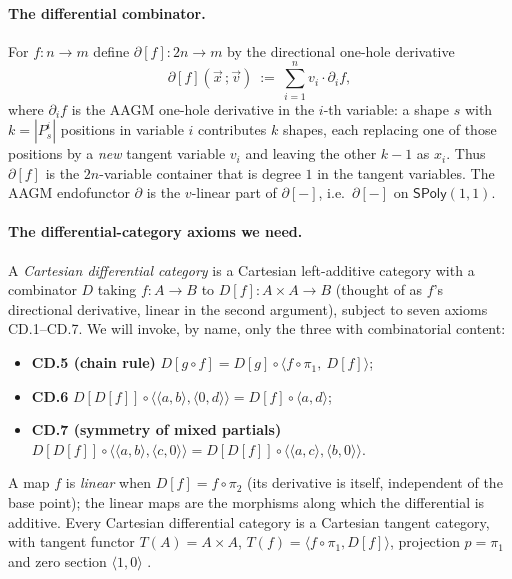 \documentclass[11pt]{article}
\theoremstyle{definition}
\newcommand{\SPoly}{\mathsf{SPoly}}
\begin{document}
\paragraph{The differential combinator.}
For $f\colon n\to m$ define $\partial[f]\colon 2n\to m$ by the directional one-hole derivative
\[
  \partial[f](\vec x\,;\vec v)\ :=\ \sum_{i=1}^{n} v_i\cdot\partial_i f,
\]
where $\partial_i f$ is the AAGM one-hole derivative in the $i$-th variable: a shape $s$ with
$k=|P^i_s|$ positions in variable $i$ contributes $k$ shapes, each replacing one of those positions
by a \emph{new} tangent variable $v_i$ and leaving the other $k-1$ as $x_i$. Thus $\partial[f]$ is
the $2n$-variable container that is degree $1$ in the tangent variables. The AAGM endofunctor
$\partial$ is the $v$-linear part of $\partial[-]$, i.e.\ $\partial[-]$ on $\SPoly(1,1)$.

\paragraph{The differential-category axioms we need.}
A \emph{Cartesian differential category} \cite{BCS2009} is a Cartesian left-additive category with a
combinator $D$ taking $f\colon A\to B$ to $D[f]\colon A\times A\to B$ (thought of as $f$'s directional
derivative, linear in the second argument), subject to seven axioms CD.1--CD.7. We will invoke, by
name, only the three with combinatorial content:
\begin{itemize}
  \item \textbf{CD.5 (chain rule)} $D[g\circ f]=D[g]\circ\langle f\circ\pi_1,\ D[f]\rangle$;
  \item \textbf{CD.6} $D[D[f]]\circ\langle\langle a,b\rangle,\langle 0,d\rangle\rangle
        =D[f]\circ\langle a,d\rangle$;
  \item \textbf{CD.7 (symmetry of mixed partials)}
        $D[D[f]]\circ\langle\langle a,b\rangle,\langle c,0\rangle\rangle
        =D[D[f]]\circ\langle\langle a,c\rangle,\langle b,0\rangle\rangle$.
\end{itemize}
A map $f$ is \emph{linear} when $D[f]=f\circ\pi_2$ (its derivative is itself, independent of the
base point); the linear maps are the morphisms along which the differential is additive. Every
Cartesian differential category is a Cartesian tangent category, with tangent functor $T(A)=A\times
A$, $T(f)=\langle f\circ\pi_1, D[f]\rangle$, projection $p=\pi_1$ and zero section $\langle
1,0\rangle$ \cite[Prop.~4.7]{CockettCruttwell2014}.
\end{document}
